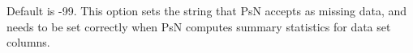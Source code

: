 

Default is -99. This option sets the string that PsN accepts as missing data, and needs to be set correctly when PsN computes summary statistics for data set columns.
\nextopt
